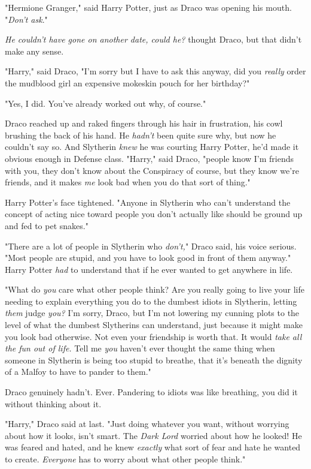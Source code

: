 "Hermione Granger," said Harry Potter, just as Draco was opening his mouth. 
"\emph{Don't ask}."

\emph{He couldn't have gone on another date, could he?} thought Draco, but that 
didn't make any sense.

"Harry," said Draco, "I'm sorry but I have to ask this anyway, did you 
\emph{really} order the mudblood girl an expensive mokeskin pouch for her 
birthday?"

"Yes, I did. You've already worked out why, of course."

Draco reached up and raked fingers through his hair in frustration, his cowl 
brushing the back of his hand. He \emph{hadn't} been quite sure why, but now he 
couldn't say so. And Slytherin \emph{knew} he was courting Harry Potter, he'd 
made it obvious enough in Defense class. "Harry," said Draco, "people know I'm 
friends with you, they don't know about the Conspiracy of course, but they know 
we're friends, and it makes \emph{me} look bad when you do that sort of thing."

Harry Potter's face tightened. "Anyone in Slytherin who can't understand the 
concept of acting nice toward people you don't actually like should be ground 
up and fed to pet snakes."

"There are a lot of people in Slytherin who \emph{don't,}" Draco said, his 
voice serious. "Most people are stupid, and you have to look good in front of 
them anyway." Harry Potter \emph{had} to understand that if he ever wanted to 
get anywhere in life.

"What do \emph{you} care what other people think? Are you really going to live 
your life needing to explain everything you do to the dumbest idiots in 
Slytherin, letting \emph{them} judge \emph{you?} I'm sorry, Draco, but I'm not 
lowering my cunning plots to the level of what the dumbest Slytherins can 
understand, just because it might make you look bad otherwise. Not even your 
friendship is worth that. It would \emph{take all the fun out of life.} Tell me 
\emph{you} haven't ever thought the same thing when someone in Slytherin is 
being too stupid to breathe, that it's beneath the dignity of a Malfoy to have 
to pander to them."

Draco genuinely hadn't. Ever. Pandering to idiots was like breathing, you did 
it without thinking about it.

"Harry," Draco said at last. "Just doing whatever you want, without worrying 
about how it looks, isn't smart. The \emph{Dark Lord} worried about how he 
looked! He was feared and hated, and he knew \emph{exactly} what sort of fear 
and hate he wanted to create. \emph{Everyone} has to worry about what other 
people think."

